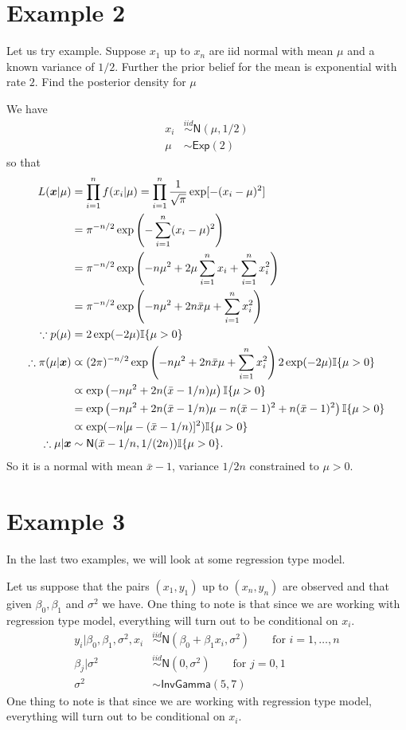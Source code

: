 \documentclass{article}
\begin{document}
\section*{Example 2}
Let us try example. Suppose $x_1$ up to $x_n$ are iid normal with mean $\mu$ and a known variance of $1/2$. Further the prior belief for the mean is exponential with rate $2$. Find the posterior density for $\mu$

We have
\[
\begin{split}
x_i&\overset{iid}{\sim}\mathsf{N}(\mu,1/2)\\
\mu&\sim\mathsf{Exp}(2)
\end{split}
\]
so that
\[
\begin{split}
L(\boldsymbol{x}|\mu)&=\prod_{i=1}^nf(x_i|\mu)=\prod_{i=1}^n\frac{1}{\sqrt{\pi}}\exp[-(x_i-\mu)^2]\\
&=\pi^{-n/2}\exp\left(-\sum_{i=1}^n(x_i-\mu)^2\right)\\
&=\pi^{-n/2}\exp\left(-n\mu^2+2\mu\sum_{i=1}^nx_i+\sum_{i=1}^nx_i^2\right)\\
&=\pi^{-n/2}\exp\left(-n\mu^2+2n\bar{x}\mu +\sum_{i=1}^nx_i^2\right)\\
\because p(\mu)&=2\exp(-2\mu)\mathbb{I}\{\mu>0\}\\
\therefore \pi(\mu|\boldsymbol{x})&\varpropto (2\pi)^{-n/2}\exp\left(-n\mu^2+2n\bar{x}\mu +\sum_{i=1}^nx_i^2\right)2\exp(-2\mu)\mathbb{I}\{\mu>0\}\\
 &\varpropto\exp\left(-n\mu^2+2n(\bar{x}-1/n)\mu\right)\mathbb{I}\{\mu>0\}\\
  &=\exp\left(-n\mu^2+2n(\bar{x}-1/n)\mu-n(\bar{x}-1)^2+n(\bar{x}-1)^2\right)\mathbb{I}\{\mu>0\}\\
  &\varpropto\exp(-n[\mu-(\bar x-1/n)]^2)\mathbb{I}\{\mu>0\}\\
  \therefore \mu|\boldsymbol{x} &\sim\mathsf{N}(\bar x-1/n,1/(2n))\mathbb{I}\{\mu>0\}.
\end{split}
\]
So it is a normal with mean $\bar x-1$, variance $1/2n$ constrained to $\mu>0$.

\section*{Example 3}
In the last two examples, we will look at some regression type model.

Let us suppose that the pairs $(x_1,y_1)$ up to $(x_n,y_n)$ are observed and that given $\beta_0,\beta_1$ and $\sigma^2$ we have. One thing to note is that since we are working with regression type model, everything will turn out to be conditional on $x_i$.
\[
\begin{split}
y_i|\beta_0,\beta_1,\sigma^2,x_i&\overset{iid}{\sim}\mathsf{N}(\beta_0+\beta_1x_i,\sigma^2)\qquad\mbox{for }i=1,\ldots,n\\
\beta_j|\sigma^2&\overset{iid}{\sim}\mathsf{N}(0,\sigma^2)\qquad\mbox{for }j=0,1\\
\sigma^2&\sim\mathsf{InvGamma}(5,7)
\end{split}
\]
One thing to note is that since we are working with regression type model, everything will turn out to be conditional on $x_i$.
\end{document}
